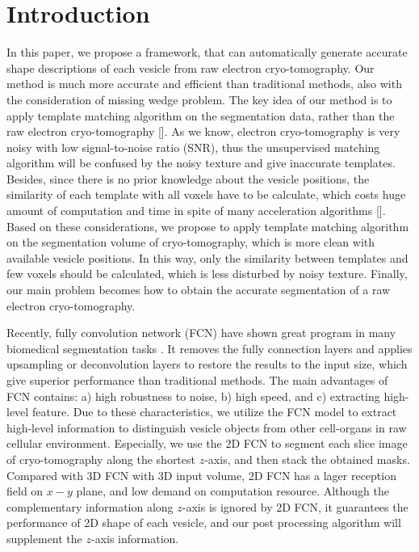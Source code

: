 \section{Introduction}
In this paper, we propose a framework, that can automatically generate accurate shape descriptions of each vesicle from raw electron cryo-tomography.
Our method is much more accurate and efficient than traditional methods, also with the consideration of missing wedge problem.
The key idea of our method is to apply template matching algorithm on the segmentation data, rather than the raw electron cryo-tomography [].
As we know, electron cryo-tomography is very noisy with low signal-to-noise ratio (SNR), thus the unsupervised matching algorithm will be confused by the noisy texture and give inaccurate templates.
Besides, since there is no prior knowledge about the vesicle positions, the similarity of each template with all voxels have to be calculate, which costs huge amount of computation and time in spite of many acceleration algorithms [].
Based on these considerations, we propose to apply template matching algorithm on the segmentation volume of cryo-tomography, which is more clean with available vesicle positions.
In this way, only the similarity between templates and few voxels should be calculated, which is less disturbed by noisy texture.
Finally, our main problem becomes how to obtain the accurate segmentation of a raw electron cryo-tomography.

Recently, fully convolution network (FCN) \cite{Shelhamer2014Fully} have shown great program in many biomedical segmentation tasks \cite{Cicek2016,Chen2017,Yu2017,Chen2017a}.
It removes the fully connection layers and applies upsampling or deconvolution layers to restore the results to the input size, which give superior performance than traditional methods.
The main advantages of FCN contains: a) high robustness to noise, b) high speed, and c) extracting high-level feature.
Due to these characteristics, we utilize the FCN model to extract high-level information to distinguish vesicle objects from other cell-organs in raw cellular environment.
Especially, we use the 2D FCN to segment each slice image of cryo-tomography along the shortest $z$-axis, and then stack the obtained masks.
Compared with 3D FCN with 3D input volume, 2D FCN has a lager reception field on $x-y$ plane, and low demand on computation resource.
Although the complementary information along $z$-axis is ignored by 2D FCN, it guarantees the performance of 2D shape of each vesicle, and our post processing algorithm will supplement the $z$-axis information.

